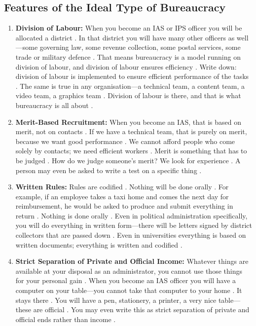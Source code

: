 \subsection{Features of the Ideal Type of Bureaucracy}
\begin{enumerate}
    \item \textbf{Division of Labour:} When you become an IAS or IPS officer you will be allocated a district . In that district you will have many other officers as well---some governing law, some revenue collection, some postal services, some trade or military defence . That means bureaucracy is a model running on division of labour, and division of labour ensures efficiency .
    Write down: division of labour is implemented to ensure efficient performance of the tasks .
    The same is true in any organisation---a technical team, a content team, a video team, a graphics team . Division of labour is there, and that is what bureaucracy is all about .

    \item \textbf{Merit-Based Recruitment:} When you become an IAS, that is based on merit, not on contacts . If we have a technical team, that is purely on merit, because we want good performance . We cannot afford people who come solely by contacts; we need efficient workers . Merit is something that has to be judged . How do we judge someone's merit? We look for experience . A person may even be asked to write a test on a specific thing .

    \item \textbf{Written Rules:} Rules are codified . Nothing will be done orally . For example, if an employee takes a taxi home and comes the next day for reimbursement, he would be asked to produce and submit everything in return . Nothing is done orally . Even in political administration specifically, you will do everything in written form---there will be letters signed by district collectors that are passed down . Even in universities everything is based on written documents; everything is written and codified .

    \item \textbf{Strict Separation of Private and Official Income:} Whatever things are available at your disposal as an administrator, you cannot use those things for your personal gain . When you become an IAS officer you will have a computer on your table---you cannot take that computer to your home . It stays there . You will have a pen, stationery, a printer, a very nice table---these are official . You may even write this as strict separation of private and official ends rather than income .


\end{enumerate}

